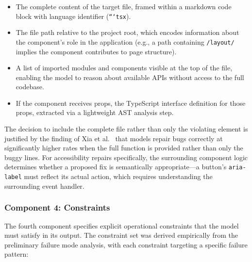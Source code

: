 \begin{itemize}
  \item The complete content of the target file, framed within a markdown
    code block with language identifier (\texttt{```tsx}).
  \item The file path relative to the project root, which encodes information
    about the component's role in the application (e.g., a path containing
    \texttt{/layout/} implies the component contributes to page structure).
  \item A list of imported modules and components visible at the top of the
    file, enabling the model to reason about available APIs without access
    to the full codebase.
  \item If the component receives props, the TypeScript interface definition
    for those props, extracted via a lightweight AST analysis step.
\end{itemize}

\noindent
The decision to include the complete file rather than only the violating
element is justified by the finding of Xia et al.\ \cite{xia2023} that
models repair bugs correctly at significantly higher rates when the full
function is provided rather than only the buggy lines.  For accessibility
repairs specifically, the surrounding component logic determines whether a
proposed fix is semantically appropriate—a button's \texttt{aria-label}
must reflect its actual action, which requires understanding the surrounding
event handler.

\subsubsection{Component 4: Constraints}

The fourth component specifies explicit operational constraints that the model
must satisfy in its output.  The constraint set was derived empirically from
the preliminary failure mode analysis, with each constraint targeting a
specific failure pattern:

